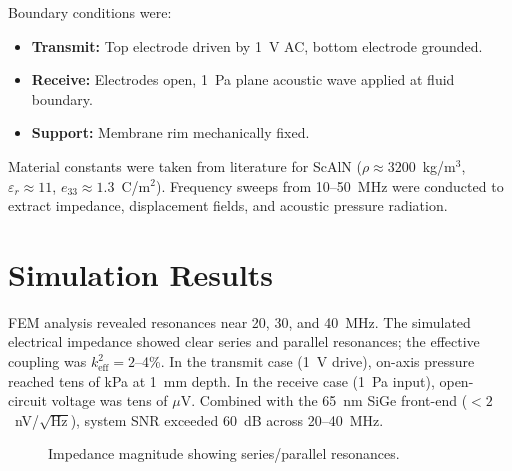 \documentclass[conference]{IEEEtran}
\begin{document}
Boundary conditions were:
\begin{itemize}
  \item \textbf{Transmit:} Top electrode driven by 1~V AC, bottom electrode grounded.
  \item \textbf{Receive:} Electrodes open, 1~Pa plane acoustic wave applied at fluid boundary.
  \item \textbf{Support:} Membrane rim mechanically fixed.
\end{itemize}

Material constants were taken from literature for ScAlN ($\rho\!\approx\!3200$~kg/m$^3$, $\varepsilon_r\!\approx\!11$, $e_{33}\!\approx\!1.3$~C/m$^2$). Frequency sweeps from 10--50~MHz were conducted to extract impedance, displacement fields, and acoustic pressure radiation.

\section{Simulation Results}
FEM analysis revealed resonances near 20, 30, and 40~MHz. The simulated electrical impedance showed clear series and parallel resonances; the effective coupling was $k^2_{\mathrm{eff}}=2$--4\%. In the transmit case (1~V drive), on-axis pressure reached tens of kPa at 1~mm depth. In the receive case (1~Pa input), open-circuit voltage was tens of $\mu$V. Combined with the 65~nm SiGe front-end ($<2$~nV/$\sqrt{\mathrm{Hz}}$), system SNR exceeded 60~dB across 20--40~MHz.

\begin{figure}[t]
\centering
{}
\caption{Impedance magnitude showing series/parallel resonances.}
\label{fig:imp}
\end{figure}
\end{document}
